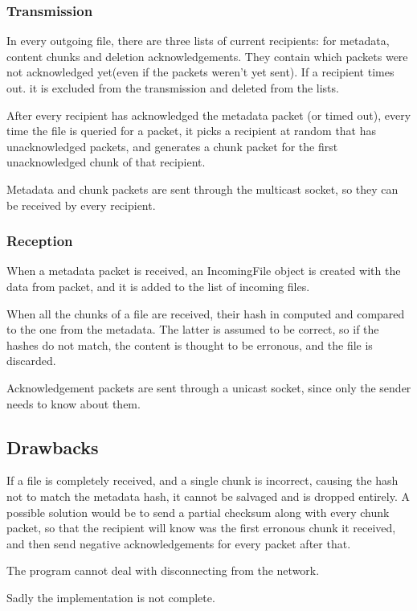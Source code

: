 \documentclass[a4paper, 12pt]{report}
\begin{document}
\subsubsection{Transmission}
In every outgoing file, there are three lists of current recipients: for metadata, content chunks and deletion acknowledgements. They contain which packets were not acknowledged yet(even if the packets weren't yet sent). If a recipient times out. it is excluded from the transmission and deleted from the lists.

After every recipient has acknowledged the metadata packet (or timed out), every time the file is queried for a packet, it picks a recipient at random that has unacknowledged packets, and generates a chunk packet for the first unacknowledged chunk of that recipient.

Metadata and chunk packets are sent through the multicast socket, so they can be received by every recipient.

\subsubsection{Reception}
When a metadata packet is received, an IncomingFile object is created with the data from packet, and it is added to the list of incoming files.

When all the chunks of a file are received, their hash in computed and compared to the one from the metadata. The latter is assumed to be correct, so if the hashes do not match, the content is thought to be erronous, and the file is discarded.

Acknowledgement packets are sent through a unicast socket, since only the sender needs to know about them.

\subsection{Drawbacks}
If a file is completely received, and a single chunk is incorrect, causing the hash not to match the metadata hash, it cannot be salvaged and is dropped entirely. A possible solution would be to send a partial checksum along with every chunk packet, so that the recipient will know was the first erronous chunk it received, and then send negative acknowledgements for every packet after that.

The program cannot deal with disconnecting from the network.

Sadly the implementation is not complete.
\end{document}

